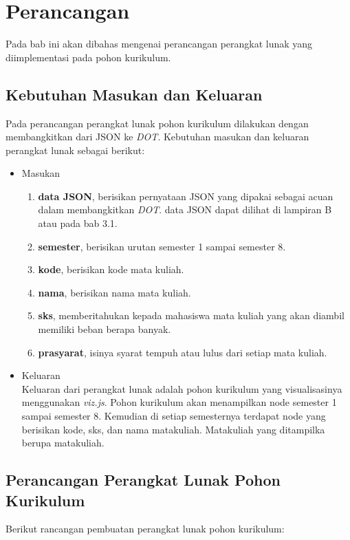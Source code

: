 \chapter{Perancangan}
\label{chap: Perancangan}

Pada bab ini akan dibahas mengenai perancangan perangkat lunak yang diimplementasi pada pohon kurikulum.

\section{Kebutuhan Masukan dan Keluaran}
\label{sec: Kebutuhan Masukan dan Keluaran}
Pada perancangan perangkat lunak pohon kurikulum dilakukan dengan membangkitkan dari JSON ke \textit{DOT}. Kebutuhan masukan dan keluaran perangkat lunak sebagai berikut:
\begin{itemize}
\item Masukan \\
\begin{enumerate}
\item \textbf{data JSON}, berisikan pernyataan JSON yang dipakai sebagai acuan dalam membangkitkan \textit{DOT}. data JSON dapat dilihat di lampiran B atau pada bab 3.1.
\item \textbf{semester}, berisikan urutan semester 1 sampai semester 8.
\item \textbf{kode}, berisikan kode mata kuliah.
\item \textbf{nama}, berisikan nama mata kuliah.
\item \textbf{sks}, memberitahukan kepada mahasiswa mata kuliah yang akan diambil memiliki beban berapa banyak.
\item \textbf{prasyarat}, isinya syarat tempuh atau lulus dari setiap mata kuliah.
\end{enumerate}
\item Keluaran\\
Keluaran dari perangkat lunak adalah pohon kurikulum yang visualisasinya menggunakan \textit{viz.js}. Pohon kurikulum akan menampilkan node semester 1 sampai semester 8. Kemudian di setiap semesternya terdapat node yang berisikan kode, sks, dan nama matakuliah. Matakuliah yang ditampilka berupa matakuliah.
\end{itemize}

\section{Perancangan Perangkat Lunak Pohon Kurikulum}
\label{sec: Perancangan Perangkat Lunak Pohon Kurikulum}
Berikut rancangan pembuatan perangkat lunak pohon kurikulum:

